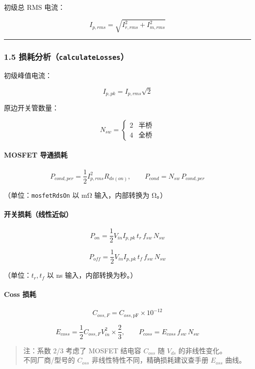\documentclass[UTF8]{ctexart}
\begin{document}
初级总 RMS 电流：

\[
I_{p,rms} = \sqrt{I_{r,rms}^{2} + I_{m,rms}^{2}}
\]

\noindent\rule{\textwidth}{0.4pt}

\subsubsection*{1.5 损耗分析（\texttt{calculateLosses}）}

初级峰值电流：

\[
I_{p,pk} = I_{p,rms}\sqrt{2}
\]

原边开关管数量：

\[
N_{sw} = \begin{cases} 2 & \text{半桥} \\ 4 & \text{全桥} \end{cases}
\]

\paragraph{MOSFET 导通损耗}

\[
P_{cond,per} = \frac{1}{2} I_{p,rms}^{2} R_{ds(on)},\qquad
P_{cond} = N_{sw} \, P_{cond,per}
\]

（单位：\texttt{mosfetRdsOn} 以 mΩ 输入，内部转换为 Ω。）

\paragraph{开关损耗（线性近似）}

\[
P_{on} = \frac{1}{2} V_{in} I_{p,pk} \, t_r \, f_{sw} \, N_{sw}
\]

\[
P_{off} = \frac{1}{2} V_{in} I_{p,pk} \, t_f \, f_{sw} \, N_{sw}
\]

（单位：\(t_r, t_f\) 以 ns 输入，内部转换为秒。）

\paragraph{Coss 损耗}

\[
C_{oss,F} = C_{oss,\text{pF}} \times 10^{-12}
\]

\[
E_{coss} = \frac{1}{2} C_{oss,F} V_{in}^{2} \times \frac{2}{3},\qquad
P_{coss} = E_{coss} \, f_{sw} \, N_{sw}
\]

\begin{quote}
注：系数 2/3 考虑了 MOSFET 结电容 \( C_{oss} \) 随 \( V_{ds} \) 的非线性变化。\\
不同厂商/型号的 \( C_{oss} \) 非线性特性不同，精确损耗建议查手册 \( E_{oss} \) 曲线。
\end{quote}
\end{document}
